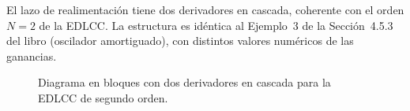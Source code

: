 \documentclass[10pt,a4paper]{article}
\begin{document}
\begin{enumerate}[label=\textbf{\alph*)}]
		El lazo de realimentación tiene dos derivadores en cascada, coherente con el orden $N = 2$ de la EDLCC. La estructura es idéntica al Ejemplo~3 de la Sección~4.5.3 del libro (oscilador amortiguado), con distintos valores numéricos de las ganancias.
		
		\begin{figure}[H]
		\centering
		
		\caption{Diagrama en bloques con dos derivadores en cascada para la EDLCC de segundo orden.}
		\end{figure}
	\end{enumerate}
\end{document}
